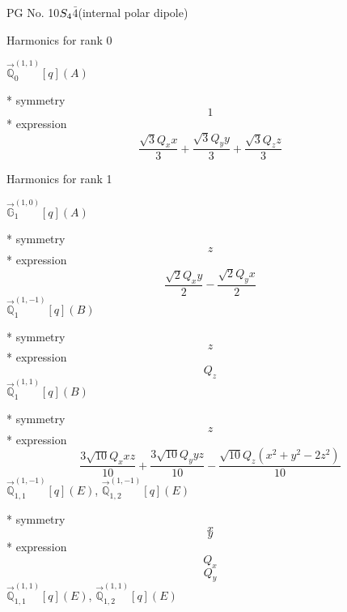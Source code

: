 \documentclass[fleqn,8pt]{jsarticle}
\begin{document}
\setcounter{MaxMatrixCols}{32}

\renewcommand{\tablename}{Table~}
\renewcommand{\figurename}{Figure~}
\begin{center}
\LARGE
PG No. 10\quad$S_{\rm 4}$\quad$\bar{4}$\quad[ tetragonal ] (internal polar dipole)
\end{center}

\noindent * Harmonics for rank 0

\noindent\quad $\vec{\mathbb{Q}}_{0}^{(1,1)}[q](A)$

\noindent\quad ** symmetry
\begin{dmath*}
1
\end{dmath*}
\noindent\quad ** expression
\begin{dmath*}
\frac{\sqrt{3} Q_{x} x}{3} + \frac{\sqrt{3} Q_{y} y}{3} + \frac{\sqrt{3} Q_{z} z}{3}
\end{dmath*}

\noindent * Harmonics for rank 1

\noindent\quad $\vec{\mathbb{G}}_{1}^{(1,0)}[q](A)$

\noindent\quad ** symmetry
\begin{dmath*}
z
\end{dmath*}
\noindent\quad ** expression
\begin{dmath*}
\frac{\sqrt{2} Q_{x} y}{2} - \frac{\sqrt{2} Q_{y} x}{2}
\end{dmath*}
\noindent\quad $\vec{\mathbb{Q}}_{1}^{(1,-1)}[q](B)$

\noindent\quad ** symmetry
\begin{dmath*}
z
\end{dmath*}
\noindent\quad ** expression
\begin{dmath*}
Q_{z}
\end{dmath*}
\noindent\quad $\vec{\mathbb{Q}}_{1}^{(1,1)}[q](B)$

\noindent\quad ** symmetry
\begin{dmath*}
z
\end{dmath*}
\noindent\quad ** expression
\begin{dmath*}
\frac{3 \sqrt{10} Q_{x} x z}{10} + \frac{3 \sqrt{10} Q_{y} y z}{10} - \frac{\sqrt{10} Q_{z} \left(x^{2} + y^{2} - 2 z^{2}\right)}{10}
\end{dmath*}
\noindent\quad $\vec{\mathbb{Q}}_{1,1}^{(1,-1)}[q](E)$, $\vec{\mathbb{Q}}_{1,2}^{(1,-1)}[q](E)$

\noindent\quad ** symmetry
\begin{dmath*}
x
\end{dmath*}
\begin{dmath*}
y
\end{dmath*}
\noindent\quad ** expression
\begin{dmath*}
Q_{x}
\end{dmath*}
\begin{dmath*}
Q_{y}
\end{dmath*}
\noindent\quad $\vec{\mathbb{Q}}_{1,1}^{(1,1)}[q](E)$, $\vec{\mathbb{Q}}_{1,2}^{(1,1)}[q](E)$
\end{document}
